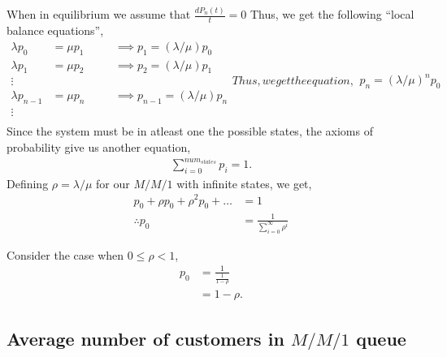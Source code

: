 \documentclass[11pt, a4paper]{report}
\begin{document}
When in equilibrium we assume that $\frac{d P_n(t)}{t} = 0$
Thus, we get the following ``local balance equations'',
\begin{subequations}
    \begin{align}
        \lambda p_0 &= \mu p_1 &&\quad \implies p_1 = (\lambda / \mu) p_0 \\
        \lambda p_1 &= \mu p_2 &&\quad \implies p_2 = (\lambda / \mu) p_1 \\
        \vdots \\
        \lambda p_{n-1} &= \mu p_n &&\quad \implies p_{n-1} = (\lambda / \mu) p_n \\
        \vdots \\
    \end{align}
    Thus, we get the equation,
    \begin{align}
        p_n = (\lambda / \mu)^n p_0
    \end{align}
    \label{eq:lclBal}
\end{subequations}
Since the system must be in atleast one the possible states, the axioms of probability give us another equation, 
\begin{align}
    \sum_{i=0}^{num_{states}} p_i = 1.
\end{align}
Defining $\rho = \lambda / \mu$ for our $M/M/1$ with infinite states, we get,
\begin{align}
    p_0 + \rho p_0 + \rho^ 2 p_0 + \ldots &= 1 \\
    \therefore p_0 &= \frac{1}{\sum_{i=0}^{\infty} \rho^i}
\end{align}

Consider the case when $0 \leq \rho < 1$,
\begin{align}
    p_0 &= \frac{1}{\frac{1}{1 - \rho}} \\
    &= 1 - \rho.
\end{align}


\subsection{Average number of customers in $M/M/1$ queue}
\end{document}
